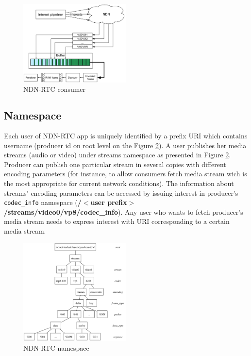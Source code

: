 \documentclass[10pt]{proc}
\begin{document}
\begin{figure}[Ht!]
\centering
\includegraphics[width=0.5\textwidth]{consumer}
\caption{NDN-RTC consumer}
\label{fig:consumer}
\end{figure}


\subsection{Namespace}

Each user of NDN-RTC app is uniquely identified by a prefix URI which contains username (producer id on root level on the Figure \ref{fig:namespace}). A user publishes her media streams (audio or video) under streams namespace as presented in Figure \ref{fig:namespace}. Producer can publish one particular stream in several copies with different encoding parameters (for instance, to allow consumers fetch media stream wich is the most appropriate for current network conditions). The information about streams’ encoding parameters can be accessed by issuing interest in producer's \texttt{codec\_info} namespace (\textbf{/$<$user prefix$>$/streams/video0/vp8/codec\_info}).
Any user who wants to fetch producer's media stream needs to express interest with URI corresponding to a certain media stream.

\begin{figure}[Ht!]
\centering
\includegraphics[width=0.5\textwidth]{namespace}
\caption{NDN-RTC namespace}
\label{fig:namespace}
\end{figure}
\end{document}
